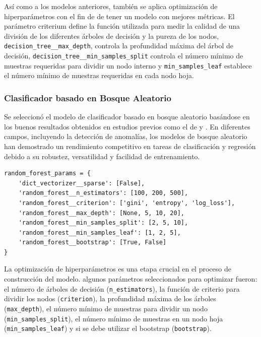 \documentclass[11pt,a4paper,spanish]{book}
\numberwithin{equation}{chapter}
\numberwithin{figure}{chapter}
\begin{document}
Así como a los modelos anteriores, también se aplica optimización de hiperparámetros 
con el fin de  de tener un modelo con mejores métricas. El parámetro criterium define 
la función utilizada para medir la calidad de una división de los diferentes árboles de 
decisión y la pureza de los nodos, \lstinline|decision_tree__max_depth|, controla la 
profundidad máxima del árbol de decisión, \lstinline|decision_tree__min_samples_split|  
controla el número mínimo de muestras requeridas para dividir un nodo interno y 
\lstinline|min_samples_leaf| establece el número mínimo de muestras requeridas en 
cada nodo hoja. 


\subsubsection{Clasificador basado en Bosque Aleatorio}

Se seleccionó el modelo de clasificador basado en bosque aleatorio basándose en los 
buenos resultados obtenidos en estudios previos como el de \cite{canovas2017random} 
y \cite{yu2025tkeo}. En diferentes campos, incluyendo la detección de anomalías, 
los modelos de bosque aleatorio han demostrado un rendimiento competitivo en tareas 
de clasificación y regresión debido a su robustez, versatilidad y facilidad de 
entrenamiento. 


\vspace{5mm}
\begin{lstlisting}
random_forest_params = {
    'dict_vectorizer__sparse': [False],
    'random_forest__n_estimators': [100, 200, 500],   
    'random_forest__criterion': ['gini', 'entropy', 'log_loss'],
    'random_forest__max_depth': [None, 5, 10, 20],
    'random_forest__min_samples_split': [2, 5, 10],
    'random_forest__min_samples_leaf': [1, 2, 5],
    'random_forest__bootstrap': [True, False]
}
\end{lstlisting}

La optimización de hiperparámetros es una etapa crucial en el proceso de construcción 
del modelo. algunos parámetros seleccionados para optimizar fueron: el número de árboles 
de decisión (\lstinline|n_estimators|), la función de criterio para dividir los nodos 
(\lstinline|criterion|), la profundidad máxima de los árboles (\lstinline|max_depth|), 
el número mínimo de muestras para dividir un nodo (\lstinline|min_samples_split|), el 
número mínimo de muestras en un nodo hoja (\lstinline|min_samples_leaf|) y si se debe 
utilizar el bootstrap (\lstinline|bootstrap|). 
\end{document}
